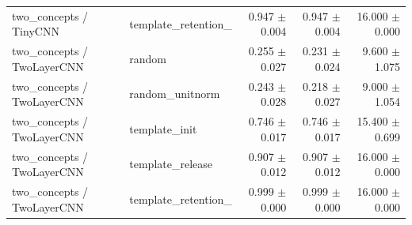 \begin{landscape}
{\begin{longtable}{p{.28\linewidth}p{.24\linewidth}rrr}
two\_\allowbreak concepts / TinyCNN & template\_\allowbreak retention\_\allowbreak 1 & 0.947 $\pm$ 0.004 & 0.947 $\pm$ 0.004 & 16.000 $\pm$ 0.000 \\
two\_\allowbreak concepts / TwoLayerCNN & random & 0.255 $\pm$ 0.027 & 0.231 $\pm$ 0.024 & 9.600 $\pm$ 1.075 \\
two\_\allowbreak concepts / TwoLayerCNN & random\_\allowbreak unitnorm & 0.243 $\pm$ 0.028 & 0.218 $\pm$ 0.027 & 9.000 $\pm$ 1.054 \\
two\_\allowbreak concepts / TwoLayerCNN & template\_\allowbreak init & 0.746 $\pm$ 0.017 & 0.746 $\pm$ 0.017 & 15.400 $\pm$ 0.699 \\
two\_\allowbreak concepts / TwoLayerCNN & template\_\allowbreak release & 0.907 $\pm$ 0.012 & 0.907 $\pm$ 0.012 & 16.000 $\pm$ 0.000 \\
two\_\allowbreak concepts / TwoLayerCNN & template\_\allowbreak retention\_\allowbreak 1 & 0.999 $\pm$ 0.000 & 0.999 $\pm$ 0.000 & 16.000 $\pm$ 0.000 \\
\end{longtable}}

\end{landscape}
